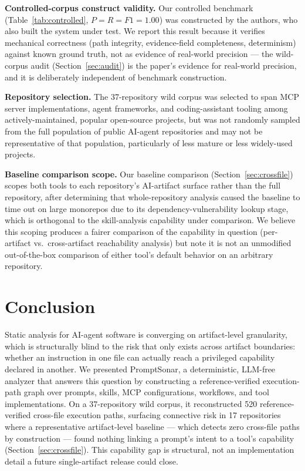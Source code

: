 \documentclass[sigconf,anonymous,review]{acmart}
\newcommand{\sysname}{PromptSonar}
\begin{document}
\textbf{Controlled-corpus construct validity.} Our controlled benchmark (Table~\ref{tab:controlled}, $P{=}R{=}F1{=}1.00$) was constructed by the authors, who also built the system under test. We report this result because it verifies mechanical correctness (path integrity, evidence-field completeness, determinism) against known ground truth, not as evidence of real-world precision --- the wild-corpus audit (Section~\ref{sec:audit}) is the paper's evidence for real-world precision, and it is deliberately independent of benchmark construction.

\textbf{Repository selection.} The 37-repository wild corpus was selected to span MCP server implementations, agent frameworks, and coding-assistant tooling among actively-maintained, popular open-source projects, but was not randomly sampled from the full population of public AI-agent repositories and may not be representative of that population, particularly of less mature or less widely-used projects.

\textbf{Baseline comparison scope.} Our baseline comparison (Section~\ref{sec:crossfile}) scopes both tools to each repository's AI-artifact surface rather than the full repository, after determining that whole-repository analysis caused the baseline to time out on large monorepos due to its dependency-vulnerability lookup stage, which is orthogonal to the skill-analysis capability under comparison. We believe this scoping produces a fairer comparison of the capability in question (per-artifact vs.\ cross-artifact reachability analysis) but note it is not an unmodified out-of-the-box comparison of either tool's default behavior on an arbitrary repository.

\section{Conclusion}
\label{sec:conclusion}
Static analysis for AI-agent software is converging on artifact-level granularity, which is structurally blind to the risk that only exists across artifact boundaries: whether an instruction in one file can actually reach a privileged capability declared in another. We presented \sysname{}, a deterministic, LLM-free analyzer that answers this question by constructing a reference-verified execution-path graph over prompts, skills, MCP configurations, workflows, and tool implementations. On a 37-repository wild corpus, it reconstructed 520 reference-verified cross-file execution paths, surfacing connective risk in 17 repositories where a representative artifact-level baseline --- which detects zero cross-file paths by construction --- found nothing linking a prompt's intent to a tool's capability (Section~\ref{sec:crossfile}). This capability gap is structural, not an implementation detail a future single-artifact release could close.
\end{document}
